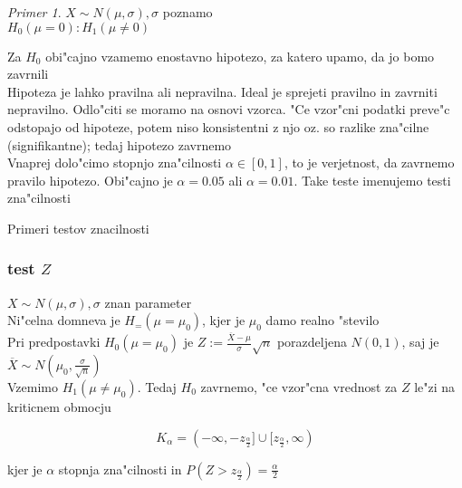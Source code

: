 \documentclass[a4paper,12pt]{article}
\theoremstyle{definition}
\theoremstyle{remark}
\newtheorem*{ex}{Primer}
\begin{document}
\begin{ex}
    $X \sim N(\mu, \sigma), \sigma$ poznamo \\
    $H_0(\mu = 0): H_1(\mu \neq 0)$
\end{ex}

Za $H_0$ obi"cajno vzamemo enostavno hipotezo, za katero upamo, da jo bomo zavrnili \\
Hipoteza je lahko pravilna ali nepravilna. Ideal je sprejeti pravilno in zavrniti nepravilno. Odlo"citi se
moramo na osnovi vzorca. "Ce vzor"cni podatki preve"c odstopajo od hipoteze, potem niso konsistentni z njo oz.
so razlike zna"cilne (signifikantne); tedaj hipotezo zavrnemo \\
Vnaprej dolo"cimo stopnjo zna"cilnosti $\alpha \in [0,1]$, to je verjetnost, da zavrnemo pravilo hipotezo.
Obi"cajno je $\alpha = 0.05$ ali $\alpha = 0.01$. Take teste imenujemo testi zna"cilnosti

Primeri testov znacilnosti

\subsubsection{test $Z$}

$X \sim N(\mu, \sigma), \sigma$ znan parameter \\
Ni"celna domneva je $H_=(\mu = \mu_0)$, kjer je $\mu_0$ damo realno "stevilo \\
Pri predpostavki $H_0(\mu = \mu_0)$ je $Z := \frac{\overline{X} - \mu}{\sigma} \sqrt{n}$ porazdeljena
$N(0,1)$, saj je $\overline{X} \sim N(\mu_0, \frac{\sigma}{\sqrt{n}})$ \\
Vzemimo $H_1(\mu \neq \mu_0)$. Tedaj $H_0$ zavrnemo, "ce vzor"cna vrednost za $Z$ le"zi na kriticnem obmocju

\begin{equation*}
    K_{\alpha} = (-\infty, -z_{\frac{\alpha}{2}}] \cup [z_{\frac{\alpha}{2}}, \infty)
\end{equation*}

kjer je $\alpha$ stopnja zna"cilnosti in $P(Z > z_{\frac{\alpha}{2}}) = \frac{\alpha}{2}$
\end{document}
